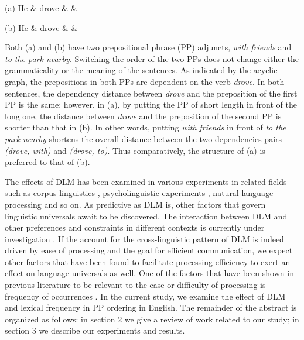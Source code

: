 \documentclass[11pt,letterpaper]{article}
\begin{document}
	{\begin{center}
			\begin{dependency}[theme = simple]
				\begin{deptext}[font=\footnotesize]
					(a) He \& drove \&  \& \\
				\end{deptext}
			\end{dependency}	
		\end{center}}
		{\begin{center}
				\begin{dependency}[theme = simple]
					\begin{deptext}[font=\footnotesize]
						(b) He \& drove  \&  \& \\
					\end{deptext}
				\end{dependency}	
			\end{center}}
Both (a) and (b) have two prepositional phrase (PP) adjuncts, \textit{with friends} and \textit{to the park nearby}. Switching the order of the two PPs does not change either the grammaticality or the meaning of the sentences. As indicated by the acyclic graph, the prepositions in both PPs are dependent on the verb \textit{drove}. In both sentences, the dependency distance between \textit{drove} and the preposition of the first PP is the same; however, in (a), by putting the PP of short length in front of the long one, the distance between \textit{drove} and the preposition of the second PP is shorter than that in (b). In other words, putting \textit{with friends} in front of \textit{to the park nearby} shortens the overall distance between the two dependencies pairs \textit{(drove, with)} and \textit{(drove, to)}. Thus comparatively, the structure of (a) is preferred to that of (b).

The effects of DLM has been examined in various experiments in related fields such as corpus linguistics \cite{Temperley:2007}, psycholinguistic experiments \cite{Yamashita:2001}, natural language processing \cite{Gildea:07} and so on. As predictive as DLM is, other factors that govern linguistic universals await to be discovered. The interaction between DLM and other preferences and constraints in different contexts is currently under investigation \cite{Gulordava:2015,Wiechmann:2013}. If the account for the cross-linguistic pattern of DLM is indeed driven by ease of processing and the goal for efficient communication, we expect other factors that have been found to facilitate processing efficiency to exert an effect on language universals as well. One of the factors that have been shown in previous literature to be relevant to the ease or difficulty of processing is frequency of occurrences \cite{Hawkins:2014}. In the current study, we examine the effect of DLM and lexical frequency in PP ordering in English. The remainder of the abstract is organized as follows: in section 2 we give a review of work related to our study; in section 3 we describe our experiments and results.
\end{document}
